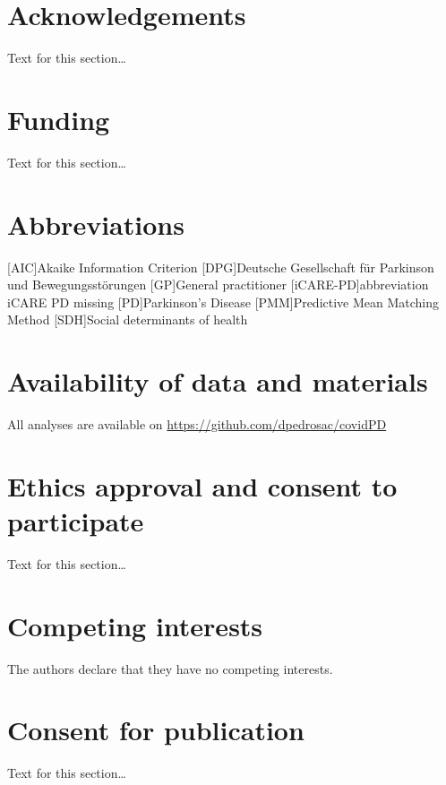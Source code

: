 \documentclass{bmcart}
\begin{document}
	
	\begin{backmatter}
		
		\section*{Acknowledgements}%
		Text for this section\ldots
		
		\section*{Funding}%
		Text for this section\ldots
		
\section*{Abbreviations}
\begin{acronym}[ECU]
[AIC]{Akaike Information Criterion}
[DPG]{Deutsche Gesellschaft für Parkinson und Bewegungsstörungen}
[GP]{General practitioner}
[iCARE-PD]{abbreviation iCARE PD missing}
[PD]{Parkinson's Disease}
[PMM]{Predictive Mean Matching Method}
[SDH]{Social determinants of health}
\end{acronym}		

\section*{Availability of data and materials}
All analyses are available on \url{https://github.com/dpedrosac/covidPD}
		
		\section*{Ethics approval and consent to participate}%
		Text for this section\ldots
		
		\section*{Competing interests}
		The authors declare that they have no competing interests.
		
		\section*{Consent for publication}%
		Text for this section\ldots
		

\end{backmatter}
\end{document}
